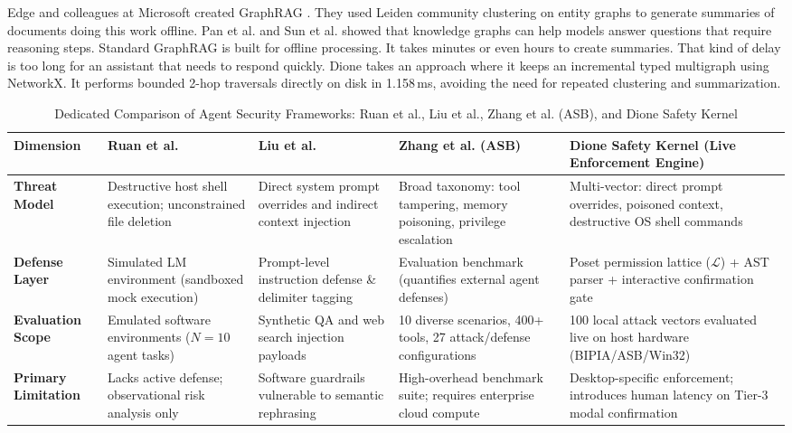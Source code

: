 \documentclass[conference,a4paper]{IEEEtran}
\begin{document}
Edge and colleagues at Microsoft created GraphRAG \cite{edge2024graphrag}. They used Leiden community clustering on entity graphs to generate summaries of documents doing this work offline. Pan et al. \cite{pan2024unifying} and Sun et al. \cite{sun2023thinkongraph} showed that knowledge graphs can help models answer questions that require reasoning steps. Standard GraphRAG is built for offline processing. It takes minutes or even hours to create summaries. That kind of delay is too long for an assistant that needs to respond quickly. Dione takes an approach where it keeps an incremental typed multigraph using NetworkX. It performs bounded 2-hop traversals directly on disk in 1.158\,ms, avoiding the need for repeated clustering and summarization.

\begin{table}[!t]
\caption{Dedicated Comparison of Agent Security Frameworks: Ruan et al., Liu et al., Zhang et al. (ASB), and Dione Safety Kernel}
\label{tab:security_comparison}
\centering
\begin{tabularx}{\textwidth}{lXXXX}
\toprule
\textbf{Dimension} & \textbf{Ruan et al. \cite{ruan2023identifying}} & \textbf{Liu et al. \cite{liu2023prompt}} & \textbf{Zhang et al. (ASB) \cite{zhang2024agent}} & \textbf{Dione Safety Kernel (Live Enforcement Engine)} \\
\midrule
\textbf{Threat Model} & Destructive host shell execution; unconstrained file deletion & Direct system prompt overrides and indirect context injection & Broad taxonomy: tool tampering, memory poisoning, privilege escalation & Multi-vector: direct prompt overrides, poisoned context, destructive OS shell commands \\
\textbf{Defense Layer} & Simulated LM environment (sandboxed mock execution) & Prompt-level instruction defense \& delimiter tagging & Evaluation benchmark (quantifies external agent defenses) & Poset permission lattice ($\mathcal{L}$) + AST parser + interactive confirmation gate \\
\textbf{Evaluation Scope} & Emulated software environments ($N=10$ agent tasks) & Synthetic QA and web search injection payloads & 10 diverse scenarios, 400+ tools, 27 attack/defense configurations & 100 local attack vectors evaluated live on host hardware (BIPIA/ASB/Win32) \\
\textbf{Primary Limitation} & Lacks active defense; observational risk analysis only & Software guardrails vulnerable to semantic rephrasing & High-overhead benchmark suite; requires enterprise cloud compute & Desktop-specific enforcement; introduces human latency on Tier-3 modal confirmation \\
\bottomrule
\end{tabularx}
\end{table}
\end{document}
